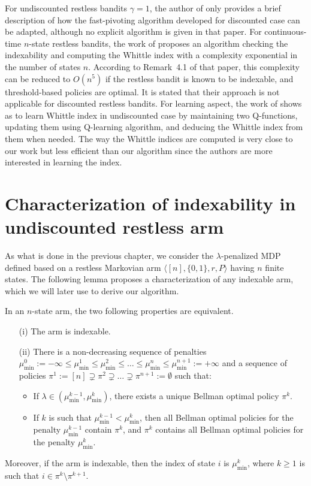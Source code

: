 For undiscounted restless bandits $\gamma=1$, the author of \cite{nino2020fast} only provides a brief description of how the fast-pivoting algorithm developed for discounted case can be adapted, although no explicit algorithm is given in that paper.
For continuous-time $n$-state restless bandits, the work of \cite{ayesta2021computation} proposes an algorithm checking the indexability and computing the Whittle index with a complexity exponential in the number of states $n$.
According to Remark~{4.1} of that paper, this complexity can be reduced to $O(n^5)$ if the restless bandit is known to be indexable, and threshold-based policies are optimal.
It is stated that their approach is not applicable for discounted restless bandits.
For learning aspect, the work of \cite{gibson2021novel} shows as to learn Whittle index in undiscounted case by maintaining two Q-functions, updating them using Q-learning algorithm, and deducing the Whittle index from them when needed.
The way the Whittle indices are computed is very close to our work but less efficient than our algorithm since the authors are more interested in learning the index. 

\section{Characterization of indexability in undiscounted restless arm}
\label{ch:cpt:sec:charac}

As what is done in the previous chapter, we consider the $\lambda$-penalized MDP defined based on a restless Markovian arm $\langle[n], \{0,1\}, r, P\rangle$ having $n$ finite states.
The following lemma proposes a characterization of any indexable arm, which we will later use to derive our algorithm.
\begin{lem}
    \label{ch:cpt:lem:idx}
    In an $n$-state arm, the two following properties are equivalent.
    \begin{enumerate}
        \item[(i)] The arm is indexable.
        \item[(ii)] There is a non-decreasing sequence of penalties $\mu_{\min}^0:=-\infty\le\mu^1_{\min}\le\mu^2_{\min}\le\dots\le\mu^n_{\min}\le\mu^{n+1}_{\min}:=+\infty$ and a sequence of policies $\pi^1:=[n]\supsetneq\pi^2\supsetneq\dots\supsetneq\pi^{n+1}:=\emptyset$ such that:
        \begin{itemize}
            \item If $\lambda\in(\mu^{k-1}_{\min},\mu^{k}_{\min})$, there exists a unique Bellman optimal policy $\pi^{k}$.
            \item If $k$ is such that $\mu^{k-1}_{\min}<\mu^{k}_{\min}$, then all Bellman optimal policies for the penalty $\mu^{k-1}_{\min}$ contain $\pi^{k}$, and $\pi^k$ contains all Bellman optimal policies for the penalty $\mu^k_{\min}$.
        \end{itemize}
    \end{enumerate}
    Moreover, if the arm is indexable, then the index of state $i$ is $\mu^k_{\min}$, where $k\ge1$ is such that $i\in\pi^k\setminus\pi^{k+1}$.
\end{lem}

